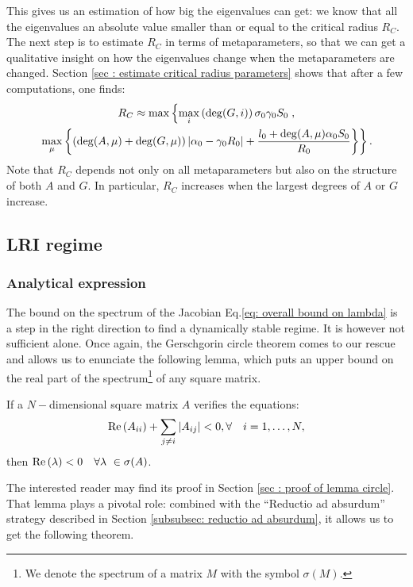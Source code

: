 \documentclass[12pt, titlepage]{report}
\begin{document}
This gives us an estimation of how big the eigenvalues can get: we know that all the eigenvalues  an absolute value smaller than or equal to the critical radius $R_C$.
The next step is to estimate $R_C$ in terms of metaparameters, so that we can get a qualitative insight on how the eigenvalues change when the metaparameters are changed. Section \ref{sec : estimate critical radius parameters} shows that after a few computations, one finds:
\begin{multline}
R_C \approx \max\left\{ \max_i\left(\deg(G,i)\right) \sigma_0 \gamma_0 S_0 \right., \\
 \left.\max_\mu\left\{\left(\deg(A, \mu)+\deg(G, \mu)\right)\left|{\alpha_0-\gamma_0 R_0}\right|+\frac{l_0+\deg(A,\mu)\alpha_0 S_0}{R_0}\right\}\right\}. \label{eq: estimate R_C metaparameters}
\end{multline}
Note that $R_C$ depends not only on all metaparameters but also on the structure of both $A$ and $G$. In particular, $R_C$ increases when the largest degrees of $A$ or $G$ increase.



\subsection{LRI regime}
\subsubsection{Analytical expression}\label{sec : strong LRI regime methods}
The bound on the spectrum of the Jacobian Eq.\eqref{eq: overall bound on lambda} is a step in the right direction to find a dynamically stable regime. It is however not sufficient alone. Once again, the Gerschgorin circle theorem comes to our rescue and allows us to enunciate the following lemma, which puts an upper bound on the real part of the spectrum\footnote{We denote the spectrum of a matrix $M$ with the symbol $\sigma(M)$. } of any square matrix.
\begin{lemma}\label{lemma: lemma Gerschgorin circle}
If a $N-$dimensional square matrix $A$ verifies the equations:
\begin{equation}
\text{Re}\left(A_{ii}\right) + \sum_{j\neq i} \left|{A_{ij}}\right| < 0, \forall \quad i=1, \dots, N, \label{eq: alternative version circle theorem}
\end{equation}
then $\real{\lambda} < 0 \quad \forall \lambda \in \sigma(A)$.
\end{lemma}
\noindent The interested reader may find its proof in Section \ref{sec : proof of lemma circle}. That lemma plays a pivotal role: combined with the ``Reductio ad absurdum'' strategy described in Section \ref{subsubsec: reductio ad absurdum}, it allows us to get the following theorem.
\end{document}
